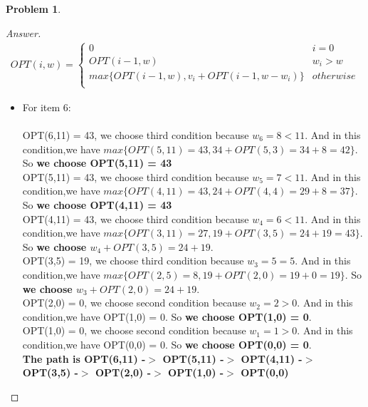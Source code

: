 \documentclass[11pt]{article}
\theoremstyle{definition}
\theoremstyle{definition}
\newtheorem{required}{Problem}
\theoremstyle{definition}
\begin{document}
\begin{required}
\begin{proof}[Answer]
\begin{align*}
OPT(i,w) = \begin{cases}
0  &  i = 0\\
OPT(i-1,w) &  w_i > w \\
max\{OPT(i-1,w),v_i+OPT(i-1,w-w_i)\} &  otherwise\\
\end{cases}
\end{align*}

\begin{itemize}
\item For item 6:\\
\\OPT(6,11) = 43, we choose third condition because $w_6 = 8 < 11$. And in this condition,we have $max\{OPT(5,11) = 43 ,34+OPT(5,3)= 34+8=42\}$. So \textbf{we choose OPT(5,11) = 43}\\
OPT(5,11) = 43, we choose third condition because $w_5 = 7 < 11$. And in this condition,we have $max\{OPT(4,11) = 43 ,24+OPT(4,4)= 29+8=37\}$. So \textbf{we choose OPT(4,11) = 43}\\
OPT(4,11) = 43, we choose third condition because $w_4 = 6 < 11$. And in this condition,we have $max\{OPT(3,11) = 27 ,19+OPT(3,5)= 24+19=43\}$. So \textbf{we choose $w_4 + OPT(3,5) = 24+19$}.\\
OPT(3,5) = 19, we choose third condition because $w_3 = 5 = 5$. And in this condition,we have $max\{OPT(2,5) = 8 ,19+OPT(2,0)= 19+0=19\}$. So \textbf{we choose $w_3 + OPT(2,0) = 24+19$}.\\
OPT(2,0) = 0, we choose second condition because $w_2 = 2 > 0$. And in this condition,we have OPT(1,0) = 0. So \textbf{we choose  OPT(1,0) = 0}.\\
OPT(1,0) = 0, we choose second condition because $w_1 = 1 > 0$. And in this condition,we have OPT(0,0) = 0. So \textbf{we choose  OPT(0,0) = 0}.\\
\textbf{The path is OPT(6,11) -$>$ OPT(5,11) -$>$ OPT(4,11) -$>$ OPT(3,5) -$>$ OPT(2,0) -$>$ OPT(1,0) -$>$ OPT(0,0)}



\end{itemize}
\end{proof}
\end{required}
\end{document}
